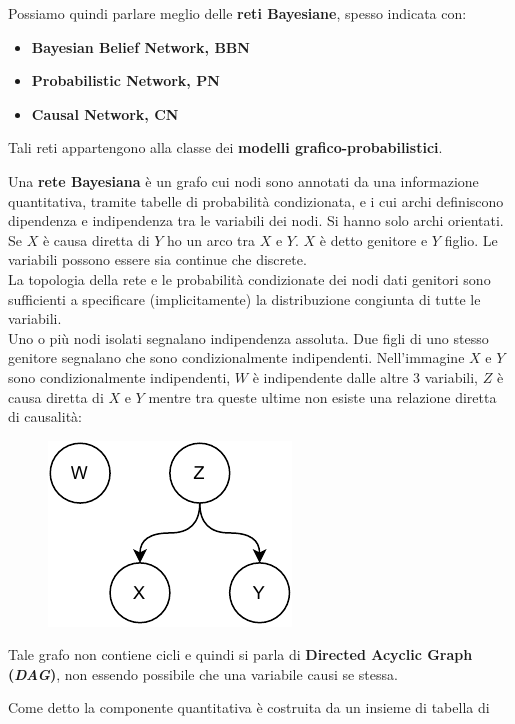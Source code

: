 \message{ !name(modprob.tex)}\documentclass[a4paper,12pt, oneside]{book}
\begin{document}
Possiamo quindi parlare meglio delle \textbf{reti Bayesiane}, spesso indicata
con:
\begin{itemize}
  \item \textbf{Bayesian Belief Network, BBN}
  \item \textbf{Probabilistic Network, PN}
  \item \textbf{Causal Network, CN}
\end{itemize}
Tali reti appartengono alla classe dei \textbf{modelli
  grafico-probabilistici}.\\ 
\begin{definizione}
  Una \textbf{rete Bayesiana} è un grafo cui nodi sono annotati da una
  informazione quantitativa, tramite tabelle di probabilità condizionata, e i
  cui archi definiscono dipendenza e indipendenza tra le variabili dei nodi. Si
  hanno solo archi orientati. Se $X$ è causa diretta di $Y$ ho un arco tra $X$ e
  $Y$. $X$ è detto genitore e $Y$ figlio. Le variabili possono essere sia
  continue che discrete.\\
  La topologia della rete e le probabilità condizionate dei nodi dati genitori
  sono sufficienti a specificare (implicitamente) la distribuzione congiunta di
  tutte le variabili.\\
  Uno o più nodi isolati segnalano indipendenza assoluta. Due figli di uno
  stesso genitore segnalano che sono condizionalmente
  indipendenti. Nell'immagine $X$ e $Y$ sono condizionalmente indipendenti, $W$
  è indipendente dalle altre 3 variabili, $Z$ è causa diretta di $X$ e $Y$
  mentre tra queste ultime non esiste una relazione diretta di causalità:
  \begin{figure}[H]
    \centering
    \includegraphics[scale = 0.9]{img/b3.pdf}
  \end{figure}
  Tale grafo non contiene cicli e quindi si parla di \textbf{Directed Acyclic
    Graph (\textit{DAG})}, non essendo possibile che una variabile causi se
  stessa. 
\end{definizione}
Come detto la componente quantitativa è costruita da un insieme di tabella di
\end{document}
